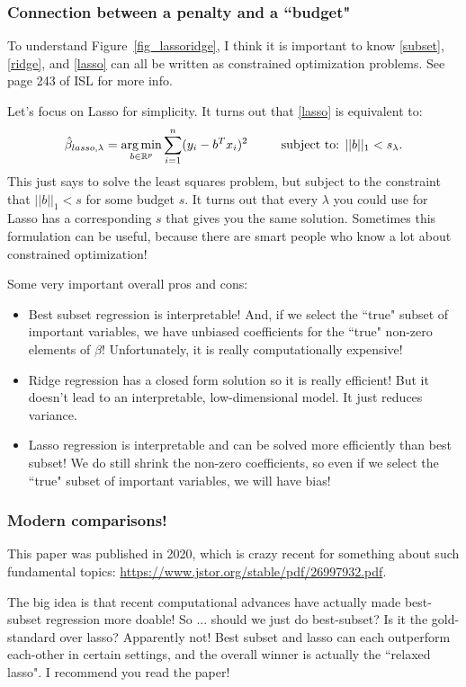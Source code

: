 \subsubsection{Connection between a penalty and a ``budget"}

To understand Figure~\ref{fig_lassoridge}, I think it is important to know \eqref{subset}, \eqref{ridge},  and \eqref{lasso} can all be written as constrained optimization problems. See page 243 of ISL for more info. 

Let's focus on Lasso for simplicity. It turns out that \eqref{lasso} is equivalent to:
$$
\hat{\beta}_{lasso,\lambda}  = \argmin_{b \in \mathbb{R}^p} \sum_{i=1}^n 	(y_i - b^T x_i)^2 \ \ \ \ \ \ \ \text{        subject to:     } ||b||_1 < s_\lambda. 
$$
This just says to solve the least squares problem, but subject to the constraint that $||b||_1 < s$ for some budget $s$. It turns out that every $\lambda$ you could use for Lasso has a corresponding $s$ that gives you the same solution. Sometimes this formulation can be useful, because there are smart people who know a lot about constrained optimization! 

Some very important overall pros and cons: 
\begin{itemize}
\item Best subset regression is interpretable! And, if we select the ``true" subset of important variables, we have unbiased coefficients for the ``true" non-zero elements of $\beta$! Unfortunately, it is really computationally expensive!
\item Ridge regression has a closed form solution so it is really efficient! But it doesn't lead to an interpretable, low-dimensional model. It just reduces variance.
\item Lasso regression is interpretable and can be solved more efficiently than best subset! We do still shrink the non-zero coefficients, so even if we select the ``true" subset of important variables, we will have bias!
\end{itemize}



\subsubsection{Modern comparisons!}

This paper was published in 2020, which is crazy recent for something about such fundamental topics:
\url{https://www.jstor.org/stable/pdf/26997932.pdf}. 

The big idea is that recent computational advances have actually made best-subset regression more doable! So ... should we just do best-subset? Is it the gold-standard over lasso? Apparently not! Best subset and lasso can each outperform each-other in certain settings, and the overall winner is actually the ``relaxed lasso". I recommend you read the paper!


